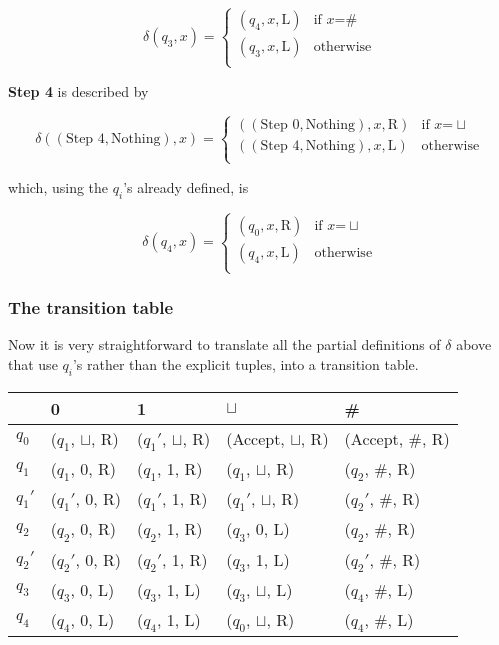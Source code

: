 \[\delta(q_3, x) = \begin{cases}
(q_4 ,x, \mathrm{L}) & \text{if } x \text{=} \#\\
(q_3,x, \mathrm{L}) & \text{otherwise}\\
\end{cases}
\]

\textbf{Step 4} is described by

\[\delta((\text{Step 4},\text{Nothing}), x) = \begin{cases}
((\text{Step 0}, \text{Nothing}),x, \mathrm{R}) & \text{if } x \text{=} \sqcup \\
((\text{Step 4},\text{Nothing}),x, \mathrm{L}) & \text{otherwise}\\
\end{cases}
\]

which, using the \(q_i\)'s already defined, is

\[\delta(q_4, x) = \begin{cases}
(q_0 ,x, \mathrm{R}) & \text{if } x \text{=} \sqcup \\
(q_4,x, \mathrm{L}) & \text{otherwise}\\
\end{cases}
\]

\hypertarget{the-transition-table}{%
\subsubsection{The transition table}\label{the-transition-table}}

Now it is very straightforward to translate all the partial definitions
of \(\delta\) above that use \(q_i\)'s rather than the explicit tuples,
into a transition table.

\begin{longtable}[]{@{}lllll@{}}
\toprule
& 0 & 1 & \(\sqcup\) & \#\tabularnewline
\midrule
\endhead
\(q_0\) & (\(q_1\), \(\sqcup\), R) & (\(q_1'\), \(\sqcup\), R) &
(Accept, \(\sqcup\), R) & (Accept, \#, R)\tabularnewline
\(q_1\) & (\(q_1\), 0, R) & (\(q_1\), 1, R) & (\(q_1\), \(\sqcup\), R) &
(\(q_2\), \#, R)\tabularnewline
\(q_1'\) & (\(q_1'\), 0, R) & (\(q_1'\), 1, R) & (\(q_1'\), \(\sqcup\),
R) & (\(q_2'\), \#, R)\tabularnewline
\(q_2\) & (\(q_2\), 0, R) & (\(q_2\), 1, R) & (\(q_3\), 0, L) &
(\(q_2\), \#, R)\tabularnewline
\(q_2'\) & (\(q_2'\), 0, R) & (\(q_2'\), 1, R) & (\(q_3\), 1, L) &
(\(q_2'\), \#, R)\tabularnewline
\(q_3\) & (\(q_3\), 0, L) & (\(q_3\), 1, L) & (\(q_3\), \(\sqcup\), L) &
(\(q_4\), \#, L)\tabularnewline
\(q_4\) & (\(q_4\), 0, L) & (\(q_4\), 1, L) & (\(q_0\), \(\sqcup\), R) &
(\(q_4\), \#, L)\tabularnewline
\bottomrule
\end{longtable}

